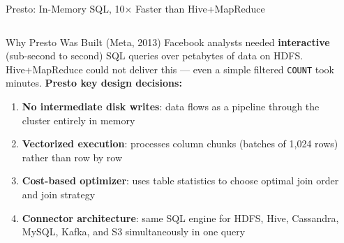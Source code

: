 \documentclass[aspectratio=169,10pt]{beamer}
\begin{document}
\begin{frame}{Presto: In-Memory SQL, 10$\times$ Faster than Hive+MapReduce}
  \begin{columns}[T]
      \begin{block}{Why Presto Was Built (Meta, 2013)}
        Facebook analysts needed \textbf{interactive} (sub-second to second) SQL queries over petabytes of data on HDFS.  Hive+MapReduce could not deliver this — even a simple filtered \texttt{COUNT} took minutes.
        \vspace{4pt}
        \textbf{Presto key design decisions:}
        \begin{enumerate}
          \item \textbf{No intermediate disk writes}: data flows as a pipeline through the cluster entirely in memory
          \item \textbf{Vectorized execution}: processes column chunks (batches of 1{,}024 rows) rather than row by row
          \item \textbf{Cost-based optimizer}: uses table statistics to choose optimal join order and join strategy
          \item \textbf{Connector architecture}: same SQL engine for HDFS, Hive, Cassandra, MySQL, Kafka, and S3 simultaneously in one query
        \end{enumerate}
      \end{block}

      \begin{center}
\end{center}
\end{columns}
\end{frame}
\end{document}
